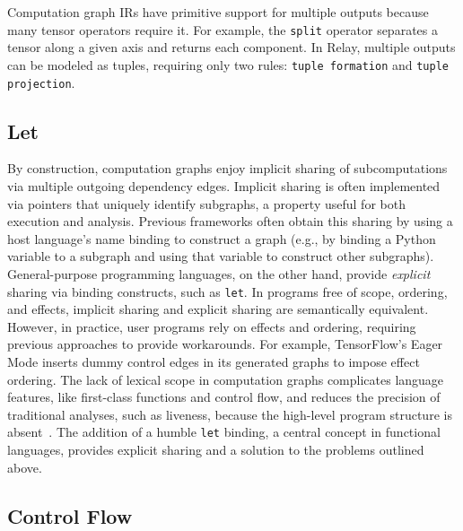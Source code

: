 Computation graph IRs have primitive support for multiple outputs
  because many tensor operators require it.
For example, the \verb|split| operator separates a tensor along a given axis
  and returns each component.
In Relay, multiple outputs can be modeled as tuples,
  requiring only two rules: \verb|tuple formation| and \verb|tuple projection|.

\subsection*{Let}

By construction, computation graphs enjoy implicit sharing of subcomputations
  via multiple outgoing dependency edges.
Implicit sharing is often implemented via pointers that uniquely identify subgraphs,
  a property useful for both execution and analysis.
Previous frameworks often obtain this sharing by using a host
  language's name binding to construct a graph (e.g., by binding a Python variable
  to a subgraph and using that variable to construct other subgraphs).
General-purpose programming languages, on the other hand, provide \textit{explicit}
  sharing via binding constructs, such as \verb|let|.
In programs free of scope, ordering, and effects, implicit sharing
  and explicit sharing are semantically equivalent.
However, in practice, user programs rely on effects and ordering,
  requiring previous approaches to provide workarounds.
For example, TensorFlow's Eager Mode inserts dummy control edges
  in its generated graphs to impose effect ordering.
The lack of lexical scope in computation graphs complicates language features,
  like first-class functions and control flow,
  and reduces the precision of traditional analyses,
  such as liveness,
  because the high-level program structure is absent~\citep{funarg, funarg_sol}.
The addition of a humble \verb|let| binding, a central concept in functional languages,
  provides explicit sharing and a solution to the problems outlined above.

\subsection*{Control Flow}

